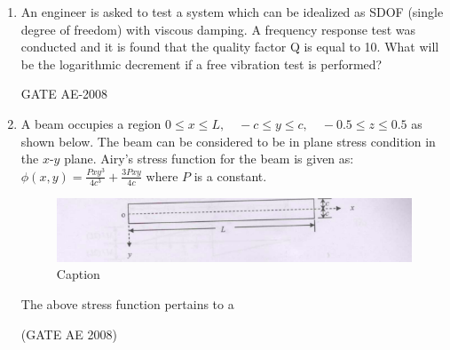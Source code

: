 \documentclass[journal,12pt,onecolumn]{IEEEtran}
\theoremstyle{remark}
\begin{document}
\begin{enumerate}
\quad

\item  An engineer is asked to test a system which can be idealized as SDOF (single degree of freedom) with viscous damping. A frequency response test was conducted and it is found that the quality factor Q is equal to 10. What will be the logarithmic decrement if a free vibration test is performed?
\begin{enumerate}
\end{enumerate}
\hfill{GATE AE-2008}

\quad

\item A beam occupies a region 
$
0 \leq x \leq L, \quad -c \leq y \leq c, \quad -0.5 \leq z \leq 0.5
$
as shown below. The beam can be considered to be in plane stress condition in the $x\text{-}y$ plane.  
Airy's stress function for the beam is given as:
$
\phi(x,y) = \frac{Pxy^{3}}{4c^{3}} + \frac{3Pxy}{4c}
$
where $P$ is a constant.
\begin{figure}[H]
    \centering
    \includegraphics[width=0.5\linewidth]{figs/Screenshot from 2025-08-08 14-58-40.png}
    \caption{Caption}
    \label{fig:placeholder}
\end{figure}
The above stress function pertains to a 
\begin{enumerate}
\end{enumerate}
\hfill(GATE AE 2008)


\end{enumerate}
\end{document}

